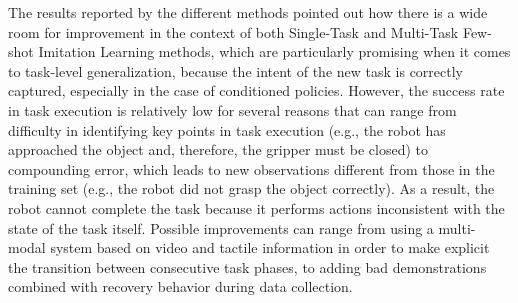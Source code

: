 The results reported by the different methods pointed out how there is a wide room for improvement in the context of both Single-Task and Multi-Task Few-shot Imitation Learning methods, which are particularly promising when it comes to task-level generalization, because the intent of the new task is correctly captured, especially in the case of conditioned policies. However, the success rate in task execution is relatively low for several reasons that can range from difficulty in identifying key points in task execution (e.g., the robot has approached the object and, therefore, the gripper must be closed) to compounding error, which leads to new observations different from those in the training set (e.g., the robot did not grasp the object correctly). As a result, the robot cannot complete the task because it performs actions inconsistent with the state of the task itself. Possible improvements can range from using a multi-modal system based on video and tactile information in order to make explicit the transition between consecutive task phases, to adding bad demonstrations combined with recovery behavior during data collection.
% 

